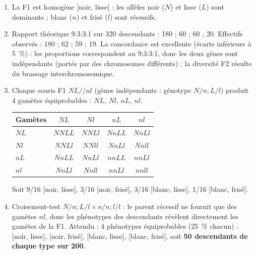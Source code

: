 \documentclass[11pt]{article}
\newcommand{\cle}[1]{{\popxbold\color{popdark}#1}}
\begin{document}
\begin{corrige}
\begin{enumerate}
\item La F1 est homogène [noir, lisse] : les allèles \cle{noir} ($N$) et \cle{lisse} ($L$) sont dominants ; \cle{blanc} ($n$) et \cle{frisé} ($l$) sont récessifs.
\item Rapport théorique 9:3:3:1 sur 320 descendants : 180 ; 60 ; 60 ; 20. Effectifs observés : 180 ; 62 ; 59 ; 19. La concordance est excellente (écarts inférieurs à 5~\%) : les proportions correspondent au 9:3:3:1, donc les deux gènes sont \cle{indépendants} (portés par des chromosomes différents) ; la diversité F2 résulte du \cle{brassage interchromosomique}.
\item Chaque souris F1 $NL//nl$ (gènes indépendants : génotype $N/n ; L/l$) produit 4 gamètes équiprobables : $NL$, $Nl$, $nL$, $nl$.
\begin{center}
\begin{tabular}{|l|c|c|c|c|}
\hline
\rowcolor{popblueL} Gamètes & $NL$ & $Nl$ & $nL$ & $nl$ \\
\hline
$NL$ & $NNLL$ & $NNLl$ & $NnLL$ & $NnLl$ \\
\hline
$Nl$ & $NNLl$ & $NNll$ & $NnLl$ & $Nnll$ \\
\hline
$nL$ & $NnLL$ & $NnLl$ & $nnLL$ & $nnLl$ \\
\hline
$nl$ & $NnLl$ & $Nnll$ & $nnLl$ & $nnll$ \\
\hline
\end{tabular}
\end{center}
Soit 9/16 [noir, lisse], 3/16 [noir, frisé], 3/16 [blanc, lisse], 1/16 [blanc, frisé].
\item Croisement-test $N/n ; L/l \times n/n ; l/l$ : le parent récessif ne fournit que des gamètes $nl$, donc les phénotypes des descendants révèlent directement les gamètes de la F1. Attendu : 4 phénotypes équiprobables (25~\% chacun) : [noir, lisse], [noir, frisé], [blanc, lisse], [blanc, frisé], soit \textbf{50 descendants de chaque type sur 200}.
\end{enumerate}
\end{corrige}
\end{document}
